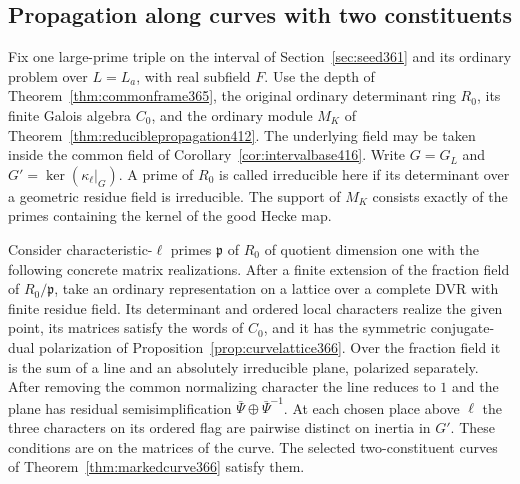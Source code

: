 \documentclass[a4paper,11pt]{article}
\theoremstyle{definition}
\theoremstyle{remark}
\numberwithin{equation}{section}
\begin{document}
\subsection{Propagation along curves with two constituents}
\label{sec:twoblockchain417}

Fix one large-prime triple on the interval of Section~\ref{sec:seed361}
and its ordinary problem over \(L=L_a\), with real subfield \(F\).
Use the depth of Theorem~\ref{thm:commonframe365}, the original
ordinary determinant ring \(R_0\), its finite Galois algebra
\(C_0\), and the ordinary module \(M_K\) of
Theorem~\ref{thm:reduciblepropagation412}. The underlying
field may be taken inside the common field of
Corollary~\ref{cor:intervalbase416}. Write \(G=G_L\) and
\(G'=\ker(\kappa_\ell|_G)\). A prime of \(R_0\) is called
irreducible here if its determinant over a geometric residue
field is irreducible. The support of \(M_K\) consists exactly
of the primes containing the kernel of the good Hecke map.

Consider characteristic-\(\ell\) primes \(\mathfrak p\) of
\(R_0\) of quotient dimension one with the following concrete
matrix realizations. After a finite extension of the fraction
field of \(R_0/\mathfrak p\), take an ordinary representation
on a lattice over a complete DVR with finite residue field.
Its determinant and ordered local characters realize the
given point, its matrices satisfy the words of \(C_0\), and it
has the symmetric conjugate-dual polarization of
Proposition~\ref{prop:curvelattice366}. Over the fraction
field it is the sum of a line and an absolutely irreducible
plane, polarized separately. After removing the common
normalizing character the line reduces to \(1\) and the plane
has residual semisimplification \(\bar\Psi\oplus\bar\Psi^{-1}\).
At each chosen place above \(\ell\) the three characters on
its ordered flag are pairwise distinct on inertia in \(G'\).
These conditions are on the matrices of the curve. The selected
two-constituent curves of Theorem~\ref{thm:markedcurve366}
satisfy them.
\end{document}
